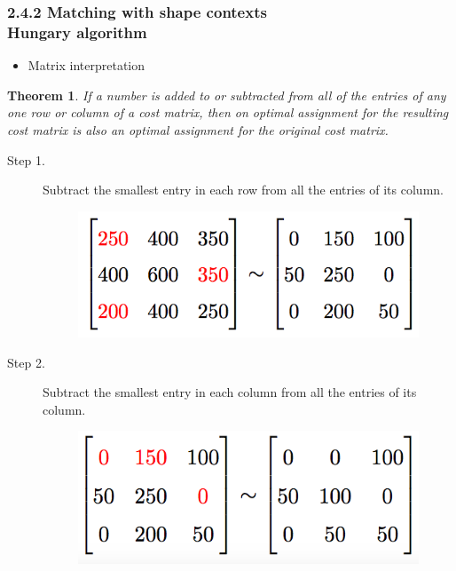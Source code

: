 \documentclass[notheorems,serif,table,compress]{beamer}  %
\begin{document}
\begin{frame}
\frametitle{2.4.2 Matching with shape contexts \\ \normalsize{Hungary algorithm}}
\begin{itemize}
    \item Matrix interpretation
\end{itemize}
\flushleft
\newtheorem*{mur}{Theorem}
\begin{mur}
\footnotesize{If a number is added to or subtracted from all of the entries of any one row or column of a cost matrix, then on optimal assignment for the resulting cost matrix is also an optimal assignment for the original cost matrix.}
\end{mur}
\begin{description}
    \item[\footnotesize{Step 1.}]  \footnotesize{Subtract the smallest entry in each row from all the entries of its column.}
        \begin{figure}
        \includegraphics[width=0.4\linewidth]{1} 
        \end{figure}
    \item[Step 2.] \footnotesize{Subtract the smallest entry in each column from all the entries of its column.}
        \begin{figure}
        \includegraphics[width=0.4\linewidth]{2} 
        \end{figure}
\end{description}
\end{frame}
\end{document}
